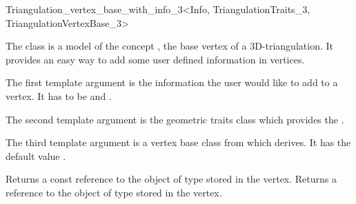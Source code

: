 

\begin{ccRefClass}{Triangulation_vertex_base_with_info_3<Info, TriangulationTraits_3, TriangulationVertexBase_3>}

\ccDefinition

The class  is a model of the concept
, the base vertex of a 3D-triangulation.
It provides an easy way to add some user defined information in vertices.


\ccParameters

The first template argument is the information the user would like to add
to a vertex.  It has to be  and .

The second template argument is the geometric traits class
 which provides the .

The third template argument is a vertex base class from which
 derives.  It has the default
value .

\ccIsModel {}

\ccInheritsFrom {}

\ccTypes
{}


\ccAccessFunctions
{}
\ccTagFullDeclarations

{Returns a const reference to the object of type  stored in the
vertex.}
\ccGlue
{}
{Returns a reference to the object of type  stored in the vertex.}
\ccSeeAlso

\\

\end{ccRefClass}
